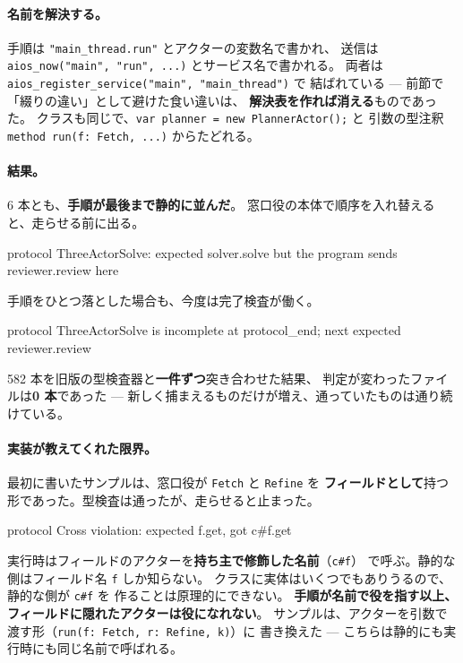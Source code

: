 \documentclass[11pt,a4paper]{ltjsarticle}
\theoremstyle{definition}
\theoremstyle{remark}
\begin{document}
\paragraph{名前を解決する。}
手順は \texttt{"main\_thread.run"} とアクターの変数名で書かれ、
送信は \texttt{aios\_now("main", "run", ...)} とサービス名で書かれる。
両者は \texttt{aios\_register\_service("main", "main\_thread")} で
結ばれている --- 前節で「綴りの違い」として避けた食い違いは、
\textbf{解決表を作れば消える}ものであった。
クラスも同じで、\texttt{var planner = new PlannerActor();} と
引数の型注釈 \texttt{method run(f: Fetch, ...)} からたどれる。

\paragraph{結果。}
6 本とも、\textbf{手順が最後まで静的に並んだ}。
窓口役の本体で順序を入れ替えると、走らせる前に出る。

\begin{term}
 protocol ThreeActorSolve: expected solver.solve
             but the program sends reviewer.review here
\end{term}

手順をひとつ落とした場合も、今度は完了検査が働く。

\begin{term}
 protocol ThreeActorSolve is incomplete at protocol_end;
             next expected reviewer.review
\end{term}

582 本を旧版の型検査器と\textbf{一件ずつ}突き合わせた結果、
判定が変わったファイルは\textbf{0 本}であった ---
新しく捕まえるものだけが増え、通っていたものは通り続けている。

\paragraph{実装が教えてくれた限界。}
最初に書いたサンプルは、窓口役が \texttt{Fetch} と \texttt{Refine} を
\textbf{フィールドとして}持つ形であった。型検査は通ったが、走らせると止まった。

\begin{term}
protocol Cross violation: expected f.get, got c#f.get
\end{term}

実行時はフィールドのアクターを\textbf{持ち主で修飾した名前}（\texttt{c\#f}）
で呼ぶ。静的な側はフィールド名 \texttt{f} しか知らない。
クラスに実体はいくつでもありうるので、静的な側が \texttt{c\#f} を
作ることは原理的にできない。
\textbf{手順が名前で役を指す以上、フィールドに隠れたアクターは役になれない}。
サンプルは、アクターを引数で渡す形（\texttt{run(f: Fetch, r: Refine, k)}）に
書き換えた --- こちらは静的にも実行時にも同じ名前で呼ばれる。
\end{document}
